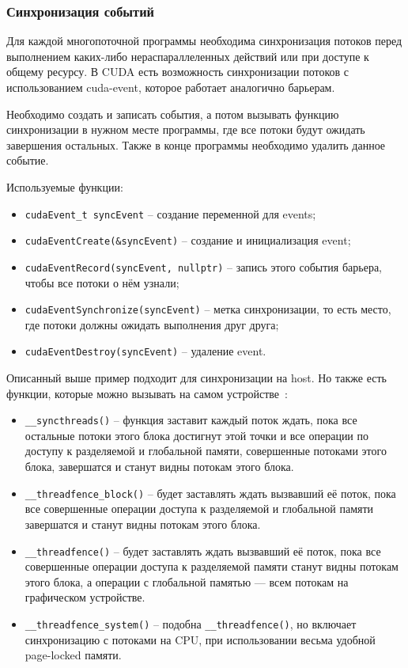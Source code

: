 \subsubsection*{Синхронизация событий}
Для каждой многопоточной программы необходима синхронизация потоков перед выполнением каких-либо нераспараллеленных действий или при доступе к общему ресурсу. В CUDA есть возможность синхронизации потоков с использованием cuda-event, которое работает аналогично барьерам.

Необходимо создать и записать события, а потом вызывать функцию синхронизации в нужном месте программы, где все потоки будут ожидать завершения остальных. Также в конце программы необходимо удалить данное событие.

Используемые функции:
\begin{itemize}
    \item \texttt{cudaEvent\_t syncEvent} -- создание переменной для events;
    \item \texttt{cudaEventCreate(\&syncEvent)} -- создание и инициализация \linebreak event;
    \item \texttt{cudaEventRecord(syncEvent, nullptr)} -- запись этого события барьера, чтобы все потоки о нём узнали;
    \item \texttt{cudaEventSynchronize(syncEvent)} -- метка синхронизации, то есть место, где потоки должны ожидать выполнения друг друга;
    \item \texttt{cudaEventDestroy(syncEvent)} -- удаление event.
\end{itemize}

Описанный выше пример подходит для синхронизации на host. Но также есть функции, которые можно вызывать на самом устройстве~\cite{CudaSyncHabr}:
\begin{itemize}
    \item\texttt{\_\_syncthreads()} -- функция заставит каждый поток ждать, пока все остальные потоки этого блока достигнут этой точки и все операции по доступу к разделяемой и глобальной памяти, совершенные потоками этого блока, завершатся и станут видны потокам этого блока.
    \item\texttt{\_\_threadfence\_block()} -- будет заставлять ждать вызвавший её поток, пока все совершенные операции доступа к разделяемой и глобальной памяти завершатся и станут видны потокам этого блока.
    \item\texttt{\_\_threadfence()} -- будет заставлять ждать вызвавший её поток, пока все совершенные операции доступа к разделяемой памяти станут видны потокам этого блока, а операции с глобальной памятью — всем потокам на графическом устройстве.
    \item\texttt{\_\_threadfence\_system()} -- подобна \texttt{\_\_threadfence()}, но включает синхронизацию с потоками на CPU, при использовании весьма удобной page-locked памяти.
\end{itemize}


